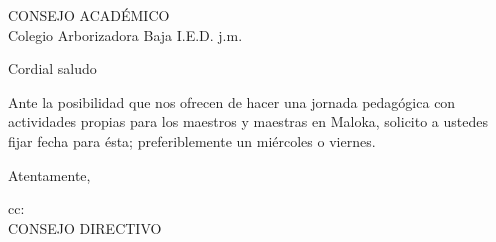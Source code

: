 \documentclass[letterpaper,spanish]{letter}
\date{25 de agosto de 2015}
\begin{document}
\begin{letter}{CONSEJO ACADÉMICO\\Colegio Arborizadora Baja I.E.D. j.m.}
	
\opening{Cordial saludo}
Ante la posibilidad que nos ofrecen de hacer una jornada pedagógica con actividades propias para los maestros y maestras en Maloka, solicito a ustedes fijar fecha para ésta; preferiblemente un miércoles o viernes.
\closing{Atentamente,}

cc{:\\CONSEJO DIRECTIVO}

\end{letter}
\end{document}
